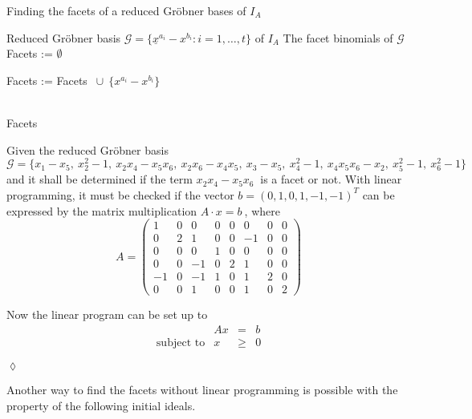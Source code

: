 \newpage

\begin{algorithm}
\caption{Finding the facets of a reduced Gröbner bases of $I_A$ \cite{tigers}}
\label{alg:facetsLP}
\label{facets}
\begin{algorithmic}[1]

\Input
Reduced Gröbner basis $ \mathcal{G} = \lbrace \underline{x}^{a_{i}} - {x}^{b_{i}} : i = 1,\dots,t  \rbrace $ of $I_A$
\Output The facet binomials of $\mathcal{G}$
\State Facets := $\emptyset$

\State Facets := Facets $~\cup~\{{x}^{a_{i}} - {x}^{b_{i}} \} $
\EndIf

\EndFor \\
\Return Facets
\end{algorithmic}
\end{algorithm}

\begin{env_example}\normalfont

Given the reduced Gröbner basis \\
 $\mathcal{G} = \{x_1 - x_5,~x_{2}^{2}-1,~x_{2}x_{4}-x_{5}x_{6},~x_{2}x_{6}-x_{4}x_{5},~x_{3}-x_{5},~x_{4}^{2}-1,~x_{4}x_{5}x_{6}-x_{2},~x_{5}^{2}-1,~x_{6}^{2}-1  \}~$ and it shall be determined if the term $x_{2}x_{4}-x_{5}x_{6}~$ is a facet or not.
 With linear programming, it must be checked if the vector $b = {\left(0,1,0,1,-1,-1\right)}^{T}$ can be expressed by the matrix multiplication $A \cdot x = b~$, where \\
 \[
 A =
 \begin{pmatrix}
 1  & 0 & 0  & 0 & 0 & 0  & 0 & 0\\ 
 0  & 2 & 1  & 0 & 0 & -1 & 0 & 0\\  
 0  & 0 & 0  & 1 & 0 & 0  & 0 & 0\\ 
 0  & 0 & -1 & 0 & 2 & 1  & 0 & 0\\
 -1 & 0 & -1 & 1 & 0 & 1  & 2 & 0\\
 0  & 0 & 1  & 0 & 0 & 1  & 0 & 2
 \end{pmatrix} 
 \] 
  
 Now the linear program can be set up to 
 \[
 	\begin{array}{lrcl}
 	\textrm{ }   & Ax    & =    & b   \\
 	\textrm{subject to}  & x     & \geq & 0
 			    
 	\end{array}
 \]
 

\begin{flushright}
$\lozenge$
\end{flushright}
\end{env_example}
\newpage 
Another way to find the facets without linear programming is possible with the property of the following initial ideals.

